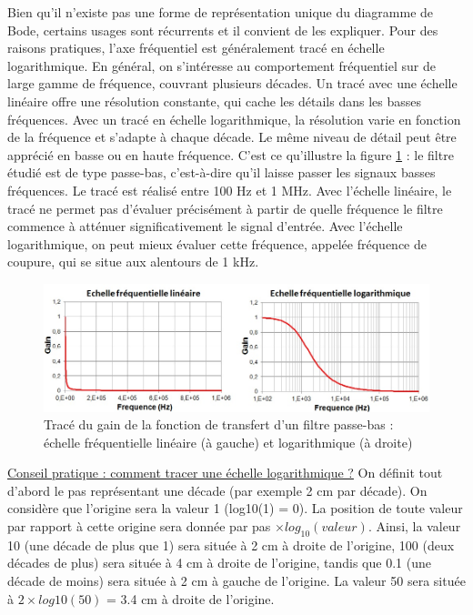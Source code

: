 \documentclass[]{book}
\begin{document}
{	Bien qu'il n'existe pas une forme de représentation unique du diagramme de Bode, certains usages sont récurrents et il convient de les expliquer. Pour des raisons pratiques, l'axe fréquentiel est généralement tracé en échelle logarithmique. En général, on s'intéresse au comportement fréquentiel sur de large gamme de fréquence, couvrant plusieurs décades. Un tracé avec une échelle linéaire offre une résolution constante, qui cache les détails dans les basses fréquences. Avec un tracé en échelle logarithmique, la résolution varie en fonction de la fréquence et s'adapte à chaque décade. Le même niveau de détail peut être apprécié en basse ou en haute fréquence. C'est ce qu'illustre la figure \ref{Fig:Effet_Flin_log} : le filtre étudié est de type passe-bas, c'est-à-dire qu'il laisse passer les signaux basses fréquences. Le tracé est réalisé entre 100 Hz et 1 MHz. Avec l'échelle linéaire, le tracé ne permet pas d'évaluer précisément à partir de quelle fréquence le filtre commence à atténuer significativement le signal d'entrée. Avec l'échelle logarithmique, on peut mieux évaluer cette fréquence, appelée fréquence de coupure, qui se situe aux alentours de 1 kHz.
	\begin{figure}[h]
		\centering
		\includegraphics[scale=0.6]{images/Effet_Flin_log.jpg}
		\caption{Tracé du gain de la fonction de transfert d'un filtre passe-bas : échelle fréquentielle linéaire (à gauche) et logarithmique (à droite)}	
		\label{Fig:Effet_Flin_log} 
	\end{figure}
	\underline{Conseil pratique : comment tracer une échelle logarithmique ?}
	On définit tout d'abord le pas représentant une décade (par exemple 2 cm par décade). On considère que l'origine sera la valeur 1 (log10(1) = 0). La position de toute valeur par rapport à cette origine sera donnée par pas $\times log_{10}(valeur)$. Ainsi, la valeur 10 (une décade de plus que 1) sera située à 2 cm à droite de l'origine, 100 (deux décades de plus) sera située à 4 cm à droite de l'origine, tandis que 0.1 (une décade de moins) sera située à 2 cm à gauche de l'origine. La valeur 50 sera située à $2\times log10(50)$ = 3.4 cm à droite de l'origine.
	
}
\end{document}
